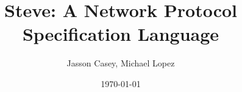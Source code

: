 \documentclass{beamer}
\begin{document}
\title{Steve: A Network Protocol Specification Language}
\author{Jasson Casey, Michael Lopez}
\date{\today} 

\frame{\titlepage} 






\end{document}
